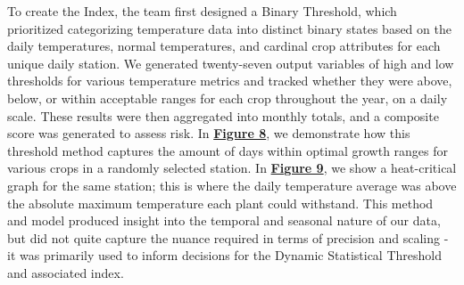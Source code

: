 \documentclass{article}
\begin{document}
To create the Index, the team first designed a Binary Threshold, which prioritized categorizing temperature data into distinct binary states based on the daily temperatures, normal temperatures, and cardinal crop attributes for each unique daily station. We generated twenty-seven output variables of high and low thresholds for various temperature metrics and tracked whether they were above, below, or within acceptable ranges for each crop throughout the year, on a daily scale. These results were then aggregated into monthly totals, and a composite score was generated to assess risk. In \textbf{\hyperref[fig:left]{Figure 8}}, we demonstrate how this threshold method captures the amount of days within optimal growth ranges for various crops in a randomly selected station. In \textbf{\hyperref[fig:right]{Figure 9}}, we show a heat-critical graph for the same station; this is where the daily temperature average was above the absolute maximum temperature each plant could withstand. This method and model produced insight into the temporal and seasonal nature of our data, but did not quite capture the nuance required in terms of precision and scaling - it was primarily used to inform decisions for the Dynamic Statistical Threshold and associated index.
\end{document}
